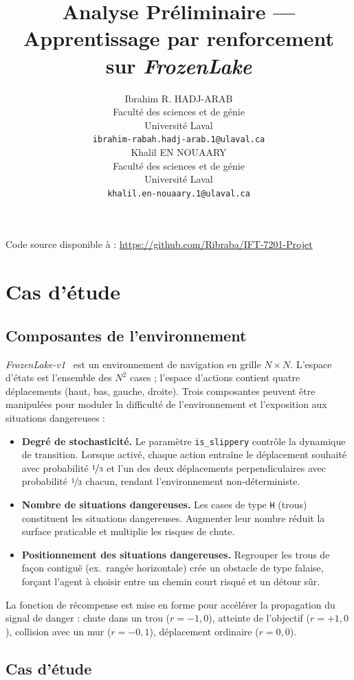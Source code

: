\documentclass{article}
\title{Analyse Préliminaire --- Apprentissage par renforcement sur \textit{FrozenLake}}
\author{
  Ibrahim R. HADJ-ARAB \\
  Faculté des sciences et de génie\\
  Université Laval\\
  \texttt{ibrahim-rabah.hadj-arab.1@ulaval.ca} \\
  \And
  Khalil EN NOUAARY \\
  Faculté des sciences et de génie\\
  Université Laval\\
  \texttt{khalil.en-nouaary.1@ulaval.ca} \\
}
\begin{document}
\maketitle

\noindent Code source disponible à : \url{https://github.com/Ribraba/IFT-7201-Projet}

\section{Cas d'étude}

\subsection{Composantes de l'environnement}

\textit{FrozenLake-v1}~\citep{towers2024} est un environnement de navigation en grille $N \times N$. L'espace d'états est l'ensemble des $N^2$ cases ; l'espace d'actions contient quatre déplacements (haut, bas, gauche, droite). Trois composantes peuvent être manipulées pour moduler la difficulté de l'environnement et l'exposition aux situations dangereuses :

\begin{itemize}
  \item \textbf{Degré de stochasticité.} Le paramètre \texttt{is\_slippery} contrôle la dynamique de transition. Lorsque activé, chaque action entraîne le déplacement souhaité avec probabilité $\nicefrac{1}{3}$ et l'un des deux déplacements perpendiculaires avec probabilité $\nicefrac{1}{3}$ chacun, rendant l'environnement non-déterministe.
  \item \textbf{Nombre de situations dangereuses.} Les cases de type \texttt{H} (trous) constituent les situations dangereuses. Augmenter leur nombre réduit la surface praticable et multiplie les risques de chute.
  \item \textbf{Positionnement des situations dangereuses.} Regrouper les trous de façon contiguë (ex.\ rangée horizontale) crée un obstacle de type falaise, forçant l'agent à choisir entre un chemin court risqué et un détour sûr.
\end{itemize}

La fonction de récompense est mise en forme pour accélérer la propagation du signal de danger : chute dans un trou ($r = -1{,}0$), atteinte de l'objectif ($r = +1{,}0$), collision avec un mur ($r = -0{,}1$), déplacement ordinaire ($r = 0{,}0$).

\subsection{Cas d'étude}
\end{document}
